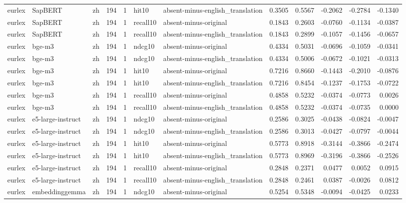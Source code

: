 \begin{tabular}{lllrrllrrrrr}
eurlex & SapBERT & zh & 194 & 1 & hit10 & absent-minus-english\_translation & 0.3505 & 0.5567 & -0.2062 & -0.2784 & -0.1340 \\
eurlex & SapBERT & zh & 194 & 1 & recall10 & absent-minus-original & 0.1843 & 0.2603 & -0.0760 & -0.1134 & -0.0387 \\
eurlex & SapBERT & zh & 194 & 1 & recall10 & absent-minus-english\_translation & 0.1843 & 0.2899 & -0.1057 & -0.1456 & -0.0657 \\
eurlex & bge-m3 & zh & 194 & 1 & ndcg10 & absent-minus-original & 0.4334 & 0.5031 & -0.0696 & -0.1059 & -0.0341 \\
eurlex & bge-m3 & zh & 194 & 1 & ndcg10 & absent-minus-english\_translation & 0.4334 & 0.5006 & -0.0672 & -0.1021 & -0.0313 \\
eurlex & bge-m3 & zh & 194 & 1 & hit10 & absent-minus-original & 0.7216 & 0.8660 & -0.1443 & -0.2010 & -0.0876 \\
eurlex & bge-m3 & zh & 194 & 1 & hit10 & absent-minus-english\_translation & 0.7216 & 0.8454 & -0.1237 & -0.1753 & -0.0722 \\
eurlex & bge-m3 & zh & 194 & 1 & recall10 & absent-minus-original & 0.4858 & 0.5232 & -0.0374 & -0.0773 & 0.0026 \\
eurlex & bge-m3 & zh & 194 & 1 & recall10 & absent-minus-english\_translation & 0.4858 & 0.5232 & -0.0374 & -0.0735 & 0.0000 \\
eurlex & e5-large-instruct & zh & 194 & 1 & ndcg10 & absent-minus-original & 0.2586 & 0.3025 & -0.0438 & -0.0824 & -0.0047 \\
eurlex & e5-large-instruct & zh & 194 & 1 & ndcg10 & absent-minus-english\_translation & 0.2586 & 0.3013 & -0.0427 & -0.0797 & -0.0044 \\
eurlex & e5-large-instruct & zh & 194 & 1 & hit10 & absent-minus-original & 0.5773 & 0.8918 & -0.3144 & -0.3866 & -0.2474 \\
eurlex & e5-large-instruct & zh & 194 & 1 & hit10 & absent-minus-english\_translation & 0.5773 & 0.8969 & -0.3196 & -0.3866 & -0.2526 \\
eurlex & e5-large-instruct & zh & 194 & 1 & recall10 & absent-minus-original & 0.2848 & 0.2371 & 0.0477 & 0.0052 & 0.0915 \\
eurlex & e5-large-instruct & zh & 194 & 1 & recall10 & absent-minus-english\_translation & 0.2848 & 0.2461 & 0.0387 & -0.0026 & 0.0812 \\
eurlex & embeddinggemma & zh & 194 & 1 & ndcg10 & absent-minus-original & 0.5254 & 0.5348 & -0.0094 & -0.0425 & 0.0233 \\

\end{tabular}
